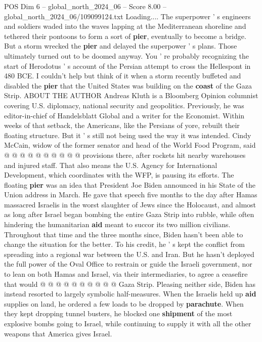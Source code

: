 \begin{textsample}{POS Dim 6 – global\_north\_2024\_06 – Score 8.00 – global\_north\_2024\_06/109099124.txt}  \label{ex:f6_pos_135}
Loading....
The superpower ' s engineers and soldiers waded into the waves lapping at the Mediterranean shoreline and tethered their pontoons to form a sort of \textbf{pier}, eventually to become a bridge.
But a storm wrecked the \textbf{pier} and delayed the superpower ' s plans.
Those ultimately turned out to be doomed anyway.
You ' re probably recognizing the start of Herodotus ' s account of the Persian attempt to cross the Hellespont in 480 BCE.
I couldn't help but think of it when a storm recently buffeted and disabled the \textbf{pier} that the United States was building on the \textbf{coast} of the Gaza Strip.
ABOUT THE AUTHOR Andreas Kluth is a Bloomberg Opinion columnist covering U.S. diplomacy, national security and geopolitics.
Previously, he was editor-in-chief of Handelsblatt Global and a writer for the Economist.
Within weeks of that setback, the Americans, like the Persians of yore, rebuilt their floating structure.
But it ' s still not being used the way it was intended.
Cindy McCain, widow of the former senator and head of the World Food Program, said @ @ @ @ @ @ @ @ @ @ provisions there, after rockets hit nearby warehouses and injured staff.
That also means the U.S.
Agency for International Development, which coordinates with the WFP, is pausing its efforts.
The floating \textbf{pier} was an idea that President Joe Biden announced in his State of the Union address in March.
He gave that speech five months to the day after Hamas massacred Israelis in the worst slaughter of Jews since the Holocaust, and almost as long after Israel began bombing the entire Gaza Strip into rubble, while often hindering the humanitarian \textbf{aid} meant to succor its two million civilians.
Throughout that time and the three months since, Biden hasn't been able to change the situation for the better.
To his credit, he ' s kept the conflict from spreading into a regional war between the U.S. and Iran.
But he hasn't deployed the full power of the Oval Office to restrain or guide the Israeli government, nor to lean on both Hamas and Israel, via their intermediaries, to agree a ceasefire that would @ @ @ @ @ @ @ @ @ @ Gaza Strip.
Pleasing neither side, Biden has instead resorted to largely symbolic half-measures.
When the Israelis held up \textbf{aid} supplies on land, he ordered a few loads to be dropped by \textbf{parachute}.
When they kept dropping tunnel busters, he blocked one \textbf{shipment} of the most explosive bombs going to Israel, while continuing to supply it with all the other weapons that America gives Israel.

\end{textsample}
